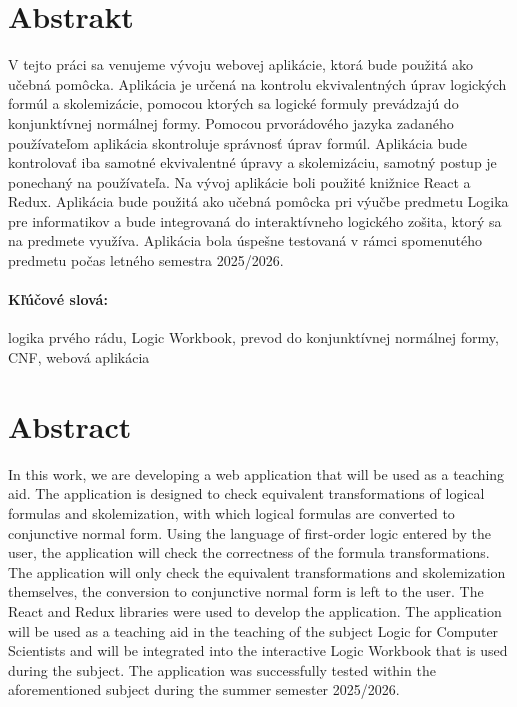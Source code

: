 \documentclass[12pt, oneside]{book}  %
\begin{document}
\newpage 
\section*{Abstrakt}

V tejto práci sa venujeme vývoju webovej aplikácie, ktorá bude použitá ako učebná pomôcka. Aplikácia je určená na kontrolu ekvivalentných úprav logických formúl a skolemizácie, pomocou ktorých sa logické formuly prevádzajú do konjunktívnej normálnej formy. Pomocou prvorádového jazyka zadaného používateľom aplikácia skontroluje správnosť úprav formúl. Aplikácia bude kontrolovať iba samotné ekvivalentné úpravy a skolemizáciu, samotný postup je ponechaný na používateľa. Na vývoj aplikácie boli použité knižnice React a Redux. Aplikácia bude použitá ako učebná pomôcka pri výučbe predmetu Logika pre informatikov a bude integrovaná do interaktívneho logického zošita, ktorý sa na predmete využíva. Aplikácia bola úspešne testovaná v rámci spomenutého predmetu počas letného semestra 2025/2026.

\paragraph*{Kľúčové slová:} logika prvého rádu, Logic Workbook, prevod do konjunktívnej normálnej formy, CNF, webová aplikácia %


\newpage 
\section*{Abstract}

In this work, we are developing a web application that will be used as a teaching aid. The application is designed to check equivalent transformations of logical formulas and skolemization, with which logical formulas are converted to conjunctive normal form. Using the language of first-order logic entered by the user, the application will check the correctness of the formula transformations. The application will only check the equivalent transformations and skolemization themselves, the conversion to conjunctive normal form is left to the user. The React and Redux libraries were used to develop the application. The application will be used as a teaching aid in the teaching of the subject Logic for Computer Scientists and will be integrated into the interactive Logic Workbook that is used during the subject. The application was successfully tested within the aforementioned subject during the summer semester 2025/2026.
\end{document}
